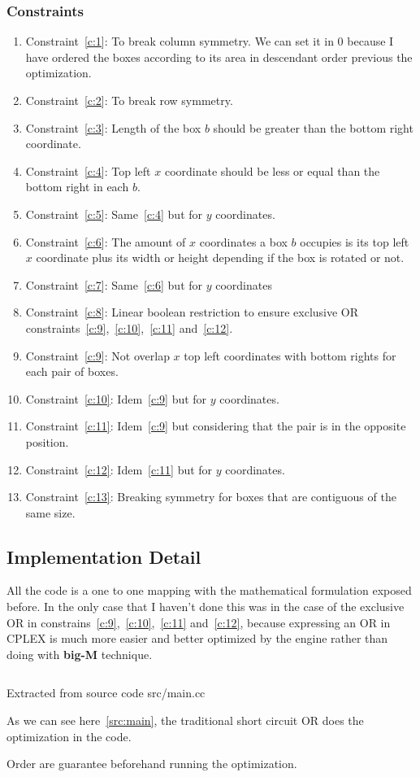 \documentclass[12pt, a4paper]{article}
\begin{document}
\subsubsection{Constraints}
\begin{enumerate}

  \item Constraint~\ref{c:1}: To break column symmetry. We can set it in $0$ because I have ordered the boxes according to its area in descendant order previous the optimization.
  \item Constraint~\ref{c:2}: To break row symmetry.
  \item Constraint~\ref{c:3}: Length of the box $b$ should be greater than the bottom right coordinate.
  \item Constraint~\ref{c:4}: Top left $x$ coordinate should be less or equal than the bottom right in each $b$.
  \item Constraint~\ref{c:5}: Same~\ref{c:4} but for $y$ coordinates.
  \item Constraint~\ref{c:6}: The amount of $x$ coordinates a box $b$ occupies is its top left $x$ coordinate plus its width or height depending if the box is rotated or not.
  \item Constraint~\ref{c:7}: Same~\ref{c:6} but for $y$ coordinates
  \item Constraint~\ref{c:8}: Linear boolean restriction to ensure exclusive OR constraints~\ref{c:9},~\ref{c:10},~\ref{c:11} and~\ref{c:12}.
  \item Constraint~\ref{c:9}: Not overlap $x$ top left coordinates with bottom rights for each pair of boxes.
  \item Constraint~\ref{c:10}: Idem~\ref{c:9} but for $y$ coordinates.
  \item Constraint~\ref{c:11}: Idem~\ref{c:9} but considering that the pair is in the opposite position.
  \item Constraint~\ref{c:12}: Idem~\ref{c:11} but for $y$ coordinates.
  \item Constraint~\ref{c:13}: Breaking symmetry for boxes that are contiguous of the same size.
\end{enumerate}

\subsection{Implementation Detail}
All the code is a one to one mapping with the mathematical formulation exposed before. In the only case that I haven't done this was in the case of the exclusive OR in constrains~\ref{c:9},~\ref{c:10},~\ref{c:11} and~\ref{c:12}, because expressing an OR in CPLEX is much more easier and better optimized by the engine rather than doing with \textbf{big-M} technique.

\begin{listing}[H]
  \inputminted[firstline=68, lastline=75, breaklines]{cpp}{../src/main.cc}
  \caption{Extracted from source code src/main.cc}
  \label{src:main}
\end{listing}

As we can see here~\ref{src:main}, the traditional short circuit OR does the optimization in the code.

Order are guarantee beforehand running the optimization.
\end{document}
